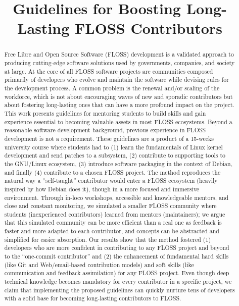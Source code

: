 \documentclass[conference]{IEEEtran}
\begin{document}
\title{Guidelines for Boosting Long-Lasting FLOSS Contributors}


\author{
  \and
}


\maketitle

\begin{abstract}
  Free Libre and Open Source Software (FLOSS) development is a validated
  approach to producing cutting-edge software solutions used by governments,
  companies, and society at large. At the core of all FLOSS software projects
  are communities composed primarily of developers who evolve and maintain the
  software while devising rules for the development process. A common problem is
  the renewal and/or scaling of the workforce, which is not about encouraging
  waves of new and sporadic contributors but about fostering long-lasting ones
  that can have a more profound impact on the project. This work presents
  guidelines for mentoring students to build skills and gain experience
  essential to becoming valuable assets in most FLOSS ecosystems. Beyond a
  reasonable software development background, previous experience in FLOSS
  development is not a requirement. These guidelines are a product of a 15-weeks
  university course where students had to (1) learn the fundamentals of Linux
  kernel development and send patches to a subsystem, (2) contribute to
  supporting tools to the GNU/Linux ecosystem, (3) introduce software packaging
  in the context of Debian, and finally (4) contribute to a chosen FLOSS
  project. The method reproduces the natural way a “self-taught” contributor
  would enter a FLOSS ecosystem (heavily inspired by how Debian does it), though
  in a more focused and immersive environment. Through in-loco workshops,
  accessible and knowledgeable mentors, and close and constant monitoring, we
  simulated a smaller FLOSS community where students (inexperienced
  contributors) learned from mentors (maintainers); we argue that this simulated
  community can be more efficient than a real one as feedback is faster and more
  adapted to each contributor, and concepts can be abstracted and simplified for
  easier absorption. Our results show that the method fostered (1) developers
  who are more confident in contributing to any FLOSS project and beyond to the
  “one-commit contributor” and (2) the enhancement of fundamental hard skills
  (like Git and Web/email-based contribution models) and soft skills (like
  communication and feedback assimilation) for any FLOSS project. Even though
  deep technical knowledge becomes mandatory for every contributor in a specific
  project, we claim that implementing the proposed guidelines can quickly
  nurture tens of developers with a solid base for becoming long-lasting
  contributors to FLOSS.
\end{abstract}
\end{document}
